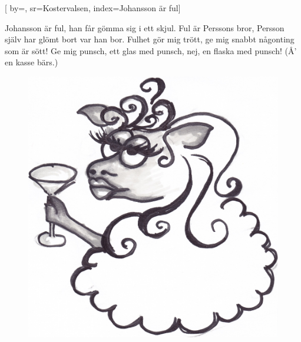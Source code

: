 

[ 		%
	by={},					%
	sr={Kostervalsen},					%
	index={Johansson är ful}]						%
	

\beginverse*						%
Johansson är ful,
han får gömma sig i ett skjul.
Ful är Perssons bror,
Persson själv har glömt bort var han bor.
Fulhet gör mig trött,
ge mig snabbt någonting som är sött!
Ge mig punsch,
ett glas med punsch,
nej, en flaska med punsch!
(Å' en kasse bärs.)
\endverse							%



\endsong							%

\begin{figure}[!b]
 \begin{center}
\includegraphics[scale=.2]{../bilder/drickande_far.jpg} 
\end{center}
\end{figure}